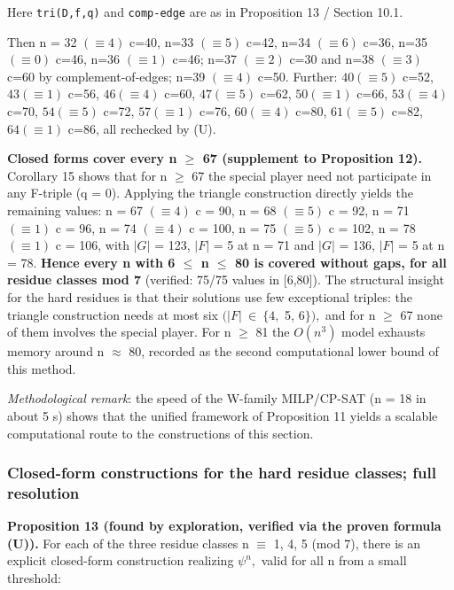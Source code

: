\documentclass[
]{article}
\newcounter{none} %
\begin{document}
Here \texttt{tri(D,f,q)} and \texttt{comp-edge} are as in Proposition 13
/ Section 10.1.

Then n = 32 \((\equiv4)\) c=40, n=33 \((\equiv5)\) c=42, n=34
\((\equiv6)\) c=36, n=35 \((\equiv0)\) c=46, n=36 \((\equiv1)\) c=46;
n=37 \((\equiv2)\) c=30 and n=38 \((\equiv3)\) c=60 by
complement-of-edges; n=39 \((\equiv4)\) c=50. Further: \(40(\equiv5)\)
c=52, \(43(\equiv1)\) c=56, \(46(\equiv4)\) c=60, \(47(\equiv5)\) c=62,
\(50(\equiv1)\) c=66, \(53(\equiv4)\) c=70, \(54(\equiv5)\) c=72,
\(57(\equiv1)\) c=76, \(60(\equiv4)\) c=80, \(61(\equiv5)\) c=82,
\(64(\equiv1)\) c=86, all rechecked by (U).

\textbf{Closed forms cover every n \(\ge\) 67 (supplement to Proposition
12).} Corollary 15 shows that for n \(\ge\) 67 the special player need
not participate in any F-triple (q = 0). Applying the triangle
construction directly yields the remaining values: n = 67 \((\equiv4)\)
c = 90, n = 68 \((\equiv5)\) c = 92, n = 71 \((\equiv1)\) c = 96, n = 74
\((\equiv4)\) c = 100, n = 75 \((\equiv5)\) c = 102, n = 78
\((\equiv1)\) c = 106, with \(\vert G\vert\) = 123, \(\vert F\vert\) = 5
at n = 71 and \(\vert G\vert\) = 136, \(\vert F\vert\) = 5 at n = 78.
\textbf{Hence every n with 6 \(\le\) n \(\le\) 80 is covered without
gaps, for all residue classes mod 7} (verified: 75/75 values in
{[}6,80{]}). The structural insight for the hard residues is that their
solutions use few exceptional triples: the triangle construction needs
at most six \((\vert F\vert\ \in\ \{4,\) 5, \(6\}),\) and for n \(\ge\)
67 none of them involves the special player. For n \(\ge\) 81 the
\(O(n^3)\) model exhausts memory around n \(\approx\) 80, recorded as
the second computational lower bound of this method.

\emph{Methodological remark}: the speed of the W-family MILP/CP-SAT (n =
18 in about 5 s) shows that the unified framework of Proposition 11
yields a scalable computational route to the constructions of this
section.

\subsubsection{Closed-form constructions for the hard residue classes;
full
resolution}\label{closed-form-constructions-for-the-hard-residue-classes-full-resolution}

\textbf{Proposition 13 (found by exploration, verified via the proven
formula (U)).} For each of the three residue classes n \(\equiv\) 1, 4,
5 (mod 7), there is an explicit closed-form construction realizing
\(\psi^n,\) valid for all n from a small threshold:
\end{document}

